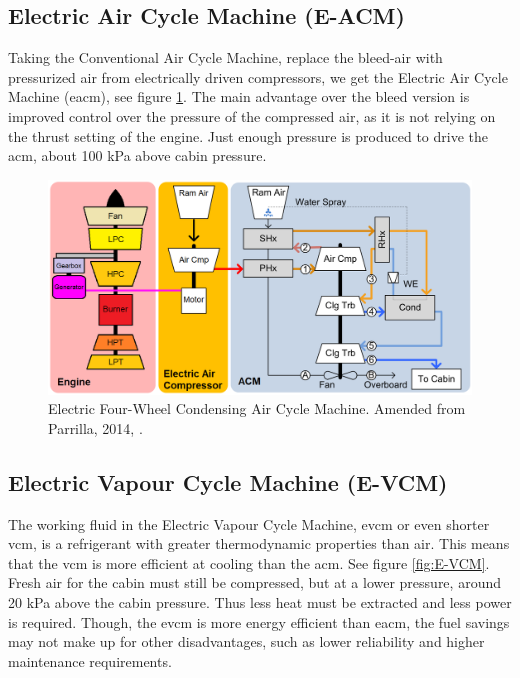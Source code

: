 \documentclass[english]{kththesis}
\begin{document}
\subsection{Electric Air Cycle Machine (E-ACM)}
\label{subsec:EACM}
Taking the Conventional Air Cycle Machine, replace the bleed-air with pressurized air from electrically driven compressors, we get the Electric Air Cycle Machine (\acrshort{eacm}), see figure \ref{fig:E-ACM}. The main advantage over the bleed version is improved control over the pressure of the compressed air, as it is not relying on the thrust setting of the engine. Just enough pressure is produced to drive the \acrshort{acm}, about 100 kPa above cabin pressure.

\begin{figure}[!ht]
    \centering
    \includegraphics[width=1\textwidth]{Epictures/All Electric Four-Wheel Condensing ECS.png}
    \caption{Electric Four-Wheel Condensing Air Cycle Machine. Amended from Parrilla, 2014, \cite{Parrilla2014}.}
    \label{fig:E-ACM}
\end{figure}


\subsection{Electric Vapour Cycle Machine (E-VCM)}
\label{subsec:EVCM}

The working fluid in the Electric Vapour Cycle Machine, \acrshort{evcm} or even shorter \acrshort{vcm}, is a refrigerant with greater thermodynamic properties than air. This means that the \acrshort{vcm} is more efficient at cooling than the \acrshort{acm}. See figure \ref{fig:E-VCM}. Fresh air for the cabin must still be compressed, but at a lower pressure, around 20 kPa above the cabin pressure. Thus less heat must be extracted and less power is required. Though, the \acrshort{evcm} is more energy efficient than \acrshort{eacm}, the fuel savings may not make up for other disadvantages, such as lower reliability and higher maintenance requirements.
\end{document}
